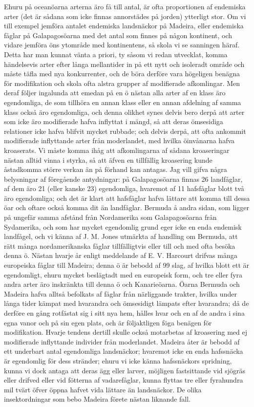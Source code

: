 Ehuru på oceanöarna arterna äro få till antal, är ofta proportionen af endemiska arter (det är sådana som icke finnas annorstädes på jorden) ytterligt stor. Om vi till exempel jemföra antalet endemiska landsnäckor på Madeira, eller endemiska fåglar på Galapagosöarna med det antal som finnes på någon kontinent, och vidare jemföra öns ytområde med kontinentens, så skola vi se sanningen häraf. Detta har man kunnat vänta a priori, ty såsom vi redan utvecklat, komma händelsevis arter efter långa mellantider in på ett nytt och isoleradt område och måste täfla med nya konkurrenter, och de böra derföre vara högeligen benägna för modifikation och skola ofta alstra grupper af modifierade afkomlingar. Men deraf följer ingalunda att emedan på en ö nästan alla arter af en klass äro egendomliga, de som tillhöra en annan klass eller en annan afdelning af samma klass också äro egendomliga, och denna olikhet synes delvis bero derpå att arter som icke äro modifierade hafva inflyttat i mängd, så att deras ömsesidiga relationer icke hafva blifvit mycket rubbade; och delvis derpå, att ofta ankommit modifierade inflyttande arter från moderlandet, med hvilka öinvånarna hafva kroaserats. Vi måste komma ihåg att afkomlingarna af sådana kroaseringar nästan alltid vinna i styrka, så att äfven en tillfällig kroasering kunde åstadkomma större verkan än på förhand kan antagas. Jag vill gifva några belysningar af föregående antydningar: på Galapagosöarna finnas 26 landfåglar, af dem äro 21 (eller kanske 23) egendomliga, hvaremot af 11 hafsfåglar blott två äro egendomliga; och det är klart att hafsfåglar hafva lättare att komma till dessa öar och oftare också komma dit än landfåglar. Bermuda å andra sidan, som ligger på ungefär samma afstånd från Nordamerika som Galapagosöarna från Sydamerika, och som har mycket egendomlig grund eger icke en enda endemisk landfågel, och vi känna af J. M. Jones utmärkta af handling om Bermuda, att rätt många nordamerikanska fåglar tillfälligtvis eller till och med ofta besöka denna ö. Nästan hvarje år enligt meddelande af E. V. Harcourt drifvas många europeiska fåglar till Madeira; denna ö är bebodd af 99 slag, af hvilka blott ett är egendomligt, ehuru mycket beslägtadt med en europeisk form, och tre eller fyra andra arter äro inskränkta till denna ö och Kanarieöarna. Öarna Bermuda och Madeira hafva alltså befolkats af fåglar från närliggande trakter, hvilka under långa tider kämpat med hvarandra och ömsesidigt lämpats efter hvarandra; då de derföre en gång rotfästat sig i sitt nya hem, hålles hvar och en af de andra i sina egna vanor och på sin egen plats, och är följaktligen föga benägen för modifikation. Hvarje tendens dertill skulle också motarbetas af kroasering med ej modifierade inflyttande individer från moderlandet. Madeira åter är bebodd af ett underbart antal egendomliga landsnäckor; hvaremot icke en enda hafssnäcka är egendomlig för dess stränder; ehuru vi icke känna hafssnäckors spridning, kunna vi dock antaga att deras ägg eller larver, möjligen fastsittande vid sjögräs eller drifved eller vid fötterna af vadarefåglar, kunna flyttas tre eller fyrahundra mil tvärt öfver öppna hafvet vida lättare än landsnäckor. De olika insektordningar som bebo Madeira förete nästan liknande fall.

